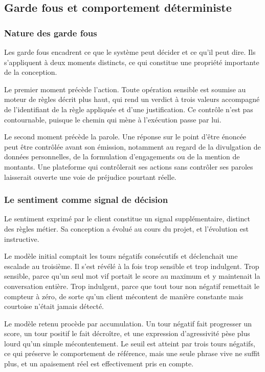 \subsection{Garde fous et comportement déterministe}

\subsubsection{Nature des garde fous}

Les garde fous encadrent ce que le système peut décider et ce qu'il peut dire. Ils s'appliquent à deux moments distincts, ce qui constitue une propriété importante de la conception.

Le premier moment précède l'action. Toute opération sensible est soumise au moteur de règles décrit plus haut, qui rend un verdict à trois valeurs accompagné de l'identifiant de la règle appliquée et d'une justification. Ce contrôle n'est pas contournable, puisque le chemin qui mène à l'exécution passe par lui.

Le second moment précède la parole. Une réponse sur le point d'être énoncée peut être contrôlée avant son émission, notamment au regard de la divulgation de données personnelles, de la formulation d'engagements ou de la mention de montants. Une plateforme qui contrôlerait ses actions sans contrôler ses paroles laisserait ouverte une voie de préjudice pourtant réelle.

\subsubsection{Le sentiment comme signal de décision}

Le sentiment exprimé par le client constitue un signal supplémentaire, distinct des règles métier. Sa conception a évolué au cours du projet, et l'évolution est instructive.

Le modèle initial comptait les tours négatifs consécutifs et déclenchait une escalade au troisième. Il s'est révélé à la fois trop sensible et trop indulgent. Trop sensible, parce qu'un seul mot vif portait le score au maximum et y maintenait la conversation entière. Trop indulgent, parce que tout tour non négatif remettait le compteur à zéro, de sorte qu'un client mécontent de manière constante mais courtoise n'était jamais détecté.

Le modèle retenu procède par accumulation. Un tour négatif fait progresser un score, un tour positif le fait décroître, et une expression d'agressivité pèse plus lourd qu'un simple mécontentement. Le seuil est atteint par trois tours négatifs, ce qui préserve le comportement de référence, mais une seule phrase vive ne suffit plus, et un apaisement réel est effectivement pris en compte.

